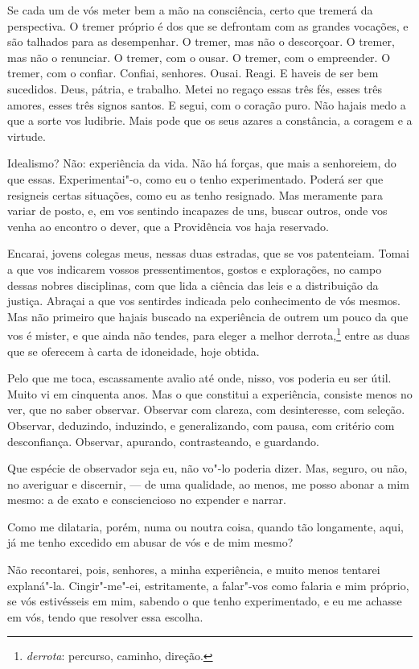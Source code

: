 Se cada um de vós meter bem a mão na consciência, certo que
tremerá da perspectiva. O tremer próprio é dos que se defrontam com as
grandes vocações, e são talhados para as desempenhar. O tremer, mas não
o descorçoar. O tremer, mas não o renunciar. O tremer, com o ousar. O
tremer, com o empreender. O tremer, com o confiar. Confiai, senhores.
Ousai. Reagi. E haveis de ser bem sucedidos. Deus, pátria, e trabalho.
Metei no regaço essas três fés, esses três amores, esses três signos
santos. E segui, com o coração puro. Não hajais medo a que a sorte vos
ludibrie. Mais pode que os seus azares a constância, a coragem e a virtude.

Idealismo? Não: experiência da vida. Não há forças, que mais a
senhoreiem, do que essas. Experimentai"-o, como eu o tenho
experimentado. Poderá ser que resigneis certas situações, como eu as
tenho resignado. Mas meramente para variar de posto, e, em vos sentindo
incapazes de uns, buscar outros, onde vos venha ao encontro o dever,
que a Providência vos haja reservado.

Encarai, jovens colegas meus, nessas duas estradas, que se vos
patenteiam. Tomai a que vos indicarem vossos pressentimentos, gostos e
explorações, no campo dessas nobres disciplinas, com que lida a ciência
das leis e a distribuição da justiça. Abraçai a que vos sentirdes
indicada pelo conhecimento de vós mesmos. Mas não primeiro que hajais
buscado na experiência de outrem um pouco da que vos é mister, e que
ainda não tendes, para eleger a melhor derrota,\footnote{ \textit{derrota}:
percurso, caminho, direção.} entre as duas que se oferecem à carta de
idoneidade, hoje obtida.

Pelo que me toca, escassamente avalio até onde, nisso, vos poderia
eu ser útil. Muito vi em cinquenta anos. Mas o que constitui a
experiência, consiste menos no ver, que no saber observar. Observar com
clareza, com desinteresse, com seleção. Observar, deduzindo, induzindo,
e generalizando, com pausa, com critério com desconfiança. Observar,
apurando, contrasteando, e guardando.

Que espécie de observador seja eu, não vo"-lo poderia dizer. Mas,
seguro, ou não, no averiguar e discernir, --- de uma qualidade, ao menos,
me posso abonar a mim mesmo: a de exato e consciencioso no expender e narrar.

Como me dilataria, porém, numa ou noutra coisa, quando tão
longamente, aqui, já me tenho excedido em abusar de vós e de mim mesmo?

Não recontarei, pois, senhores, a minha experiência, e muito menos
tentarei explaná"-la. Cingir"-me"-ei, estritamente, a falar"-vos como
falaria e mim próprio, se vós estivésseis em mim, sabendo o que tenho
experimentado, e eu me achasse em vós, tendo que resolver essa escolha.

